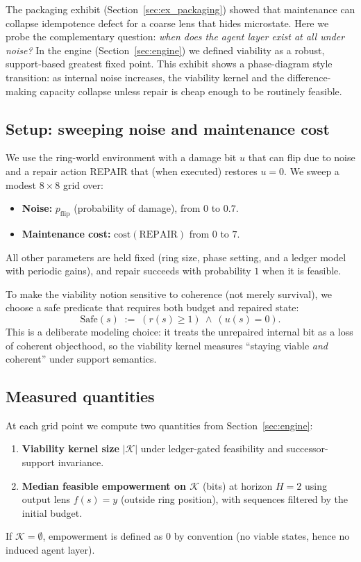 \documentclass[11pt]{article}
\newcommand{\K}{\mathcal{K}}
\begin{document}
The packaging exhibit (Section~\ref{sec:ex_packaging}) showed that maintenance can collapse idempotence defect for a coarse lens that hides microstate. Here we probe the complementary question: \emph{when does the agent layer exist at all under noise?} In the engine (Section~\ref{sec:engine}) we defined viability as a robust, support-based greatest fixed point. This exhibit shows a phase-diagram style transition: as internal noise increases, the viability kernel and the difference-making capacity collapse unless repair is cheap enough to be routinely feasible.

\subsection{Setup: sweeping noise and maintenance cost}
We use the ring-world environment with a damage bit $u$ that can flip due to noise and a repair action REPAIR that (when executed) restores $u=0$. We sweep a modest $8\times 8$ grid over:
\begin{itemize}[leftmargin=*, itemsep=0.25em]
  \item \textbf{Noise:} $p_{\mathrm{flip}}$ (probability of damage), from $0$ to $0.7$.
  \item \textbf{Maintenance cost:} $\mathrm{cost}(\text{REPAIR})$ from $0$ to $7$.
\end{itemize}
All other parameters are held fixed (ring size, phase setting, and a ledger model with periodic gains), and repair succeeds with probability $1$ when it is feasible.

To make the viability notion sensitive to coherence (not merely survival), we choose a safe predicate that requires both budget and repaired state:
\[
\mathrm{Safe}(s) \;:=\; (r(s)\ge 1)\ \wedge\ (u(s)=0).
\]
This is a deliberate modeling choice: it treats the unrepaired internal bit as a loss of coherent objecthood, so the viability kernel measures ``staying viable \emph{and} coherent'' under support semantics.

\subsection{Measured quantities}
At each grid point we compute two quantities from Section~\ref{sec:engine}:
\begin{enumerate}[leftmargin=*, itemsep=0.25em]
  \item \textbf{Viability kernel size} $|\K|$ under ledger-gated feasibility and successor-support invariance.
  \item \textbf{Median feasible empowerment on $\K$} (bits) at horizon $H=2$ using output lens $f(s)=y$ (outside ring position), with sequences filtered by the initial budget.
\end{enumerate}
If $\K=\emptyset$, empowerment is defined as $0$ by convention (no viable states, hence no induced agent layer).
\end{document}
